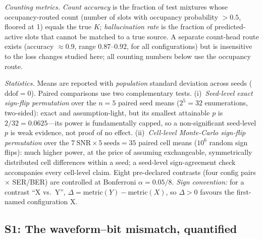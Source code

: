 \documentclass[review,12pt]{elsarticle}
\begin{document}
\emph{Counting metrics.} \emph{Count accuracy} is the fraction of test
mixtures whose occupancy-routed count (number of slots with occupancy
probability $> 0.5$, floored at 1) equals the true $K$; \emph{hallucination rate} is
the fraction of predicted-active slots that cannot be matched to a true
source. A separate count-head route exists (accuracy $\approx$0.9,
range $0.87$--$0.92$, for all
configurations) but is insensitive to the loss changes studied here; all
counting numbers below use the occupancy route.

\emph{Statistics.} Means are reported with \emph{population} standard
deviation across seeds ($\mathrm{ddof}{=}0$). Paired comparisons use two
complementary tests. (i)~\emph{Seed-level exact sign-flip permutation}
over the $n{=}5$ paired seed means ($2^5{=}32$ enumerations, two-sided):
exact and assumption-light, but its smallest attainable $p$ is
$2/32 = 0.0625$---its power is fundamentally capped, so a non-significant
seed-level $p$ is weak evidence, not proof of no effect.
(ii)~\emph{Cell-level Monte-Carlo sign-flip permutation} over the
$7\ \mathrm{SNR} \times 5\ \mathrm{seeds} = 35$ paired cell means
($10^6$ random sign flips): much higher power, at the price of assuming
exchangeable, symmetrically distributed cell differences within a seed;
a seed-level sign-agreement check accompanies every cell-level claim.
Eight pre-declared contrasts (four config pairs $\times$ SER/BER) are
controlled at Bonferroni $\alpha = 0.05/8$. \emph{Sign convention:} for
a contrast ``X vs.\ Y'', $\Delta = \mathrm{metric}(Y) -
\mathrm{metric}(X)$, so $\Delta > 0$ favours the first-named
configuration X.

\subsection{S1: The waveform--bit mismatch, quantified}
\label{sec:s1}
\end{document}
